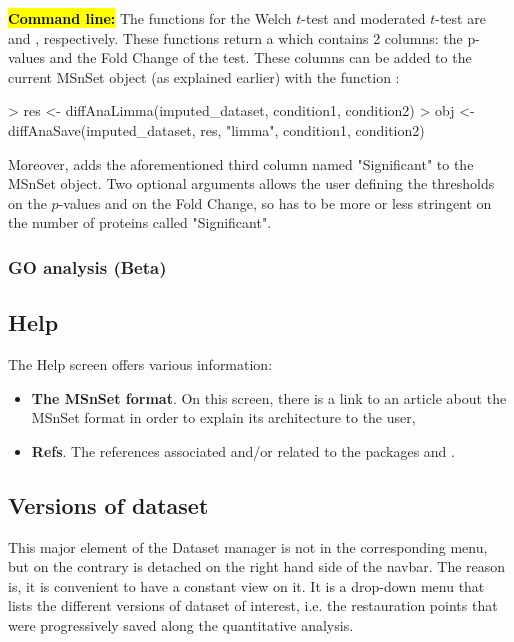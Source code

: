 \documentclass[12pt]{article}
\begin{document}
{\hl{\bf Command line:} The  functions for the Welch $t$-test 
and moderated $t$-test are  and 
, respectively. These functions return a 
 which contains 2 columns: the p-values and the Fold Change 
of the test. These columns can be added to the current MSnSet object 
 (as explained earlier) with the function 
:
\begin{Schunk}
\begin{Sinput}
> res <- diffAnaLimma(imputed_dataset, condition1, condition2)
> obj <- diffAnaSave(imputed_dataset, res, "limma", condition1, condition2)
\end{Sinput}
\end{Schunk}
Moreover,  adds the aforementioned third column 
named "Significant" to the MSnSet object. Two optional arguments allows the 
user defining the thresholds on the $p$-values and on the Fold Change, so has 
to be more or less stringent on the number of proteins called "Significant".


\subsubsection{GO analysis (Beta)}\label{sec:GOAnalysis}



\subsection{Help}
The Help screen offers various information:
\begin{itemize}
\item\textbf{{The MSnSet format}}. On this screen, there is a link to an 
article about the MSnSet format in order to explain its architecture to the 
user,
\item\textbf{{Refs}}. The references associated and/or related to the 
packages  and .
\end{itemize}


\subsection{Versions of dataset}\label{sec:availabledatasets}
This major element of the Dataset manager is not in the corresponding menu, 
but on the contrary is detached on the right hand side of the navbar. The 
reason is,  it is convenient to have a constant view on it. It is a drop-down 
menu that lists the different versions of dataset of interest, i.e. the 
restauration points that were progressively saved along the quantitative 
analysis. 

}
\end{document}

